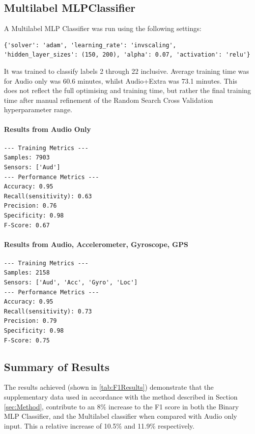 \documentclass{UoNMCHA}
\numberwithin{equation}{section}
\begin{document}
\subsection{Multilabel MLPClassifier}

A Multilabel MLP Classifier was run using the following settings:
\begin{lstlisting}[breaklines=true]
    {'solver': 'adam', 'learning_rate': 'invscaling', 'hidden_layer_sizes': (150, 200), 'alpha': 0.07, 'activation': 'relu'}
\end{lstlisting}
It was trained to classify labels 2 through 22 inclusive. Average training time was for Audio only was 60.6 minutes, whilst Audio+Extra was 73.1 minutes. This does not reflect the full optimising and training time, but rather the final training time after manual refinement of the Random Search Cross Validation hyperparameter range.

\paragraph{Results from Audio Only}
\begin{lstlisting}
--- Training Metrics ---
Samples: 7903
Sensors: ['Aud']
--- Performance Metrics ---
Accuracy: 0.95
Recall(sensitivity): 0.63
Precision: 0.76
Specificity: 0.98
F-Score: 0.67
\end{lstlisting}

\paragraph{Results from Audio, Accelerometer, Gyroscope, GPS}
\begin{lstlisting}
--- Training Metrics ---
Samples: 2158
Sensors: ['Aud', 'Acc', 'Gyro', 'Loc']
--- Performance Metrics ---
Accuracy: 0.95
Recall(sensitivity): 0.73
Precision: 0.79
Specificity: 0.98
F-Score: 0.75

\end{lstlisting}

\subsection{Summary of Results}
The results achieved (shown in \ref{tab:F1Results}) demonstrate that the supplementary data used in accordance with the method described in Section \ref{sec:Method}, contribute to an 8\% increase to the F1 score in both the Binary MLP Classifier, and the Multilabel classifier when compared with Audio only input. This a relative increase of 10.5\% and 11.9\% respectively. 
\end{document}
